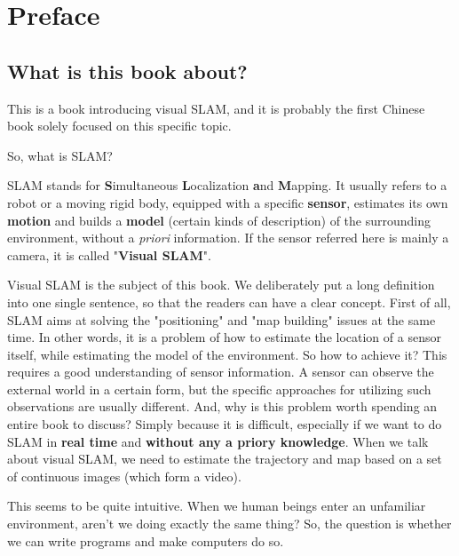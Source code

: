 \chapter{Preface}

\section{What is this book about?}

This is a book introducing visual SLAM, and it is probably the first Chinese book solely focused on this specific topic.

So, what is SLAM?

SLAM stands for \textbf{S}imultaneous \textbf{L}ocalization \textbf{a}nd \textbf{M}apping. It usually refers to a robot or a moving rigid body, equipped with a specific \textbf{sensor}, estimates its own \textbf{motion} and builds a \textbf{model} (certain kinds of description) of the surrounding environment, without a \textit{priori} information\cite{Davison2007}. If the sensor referred here is mainly a camera, it is called "\textbf{Visual SLAM}".

Visual SLAM is the subject of this book. We deliberately put a long definition into one single sentence, so that the readers can have a clear concept. First of all, SLAM aims at solving the "positioning" and "map building" issues at the same time. In other words, it is a problem of how to estimate the location of a sensor itself, while estimating the model of the environment. So how to achieve it? This requires a good understanding of sensor information. A sensor can observe the external world in a certain form, but the specific approaches for utilizing such observations are usually different. And, why is this problem worth spending an entire book to discuss? Simply because it is difficult, especially if we want to do SLAM in \textbf{real time} and \textbf{without any a priory knowledge}. When we talk about visual SLAM, we need to estimate the trajectory and map based on a set of continuous images (which form a video).

This seems to be quite intuitive. When we human beings enter an unfamiliar environment, aren't we doing exactly the same thing? So, the question is whether we can write programs and make computers do so. 

